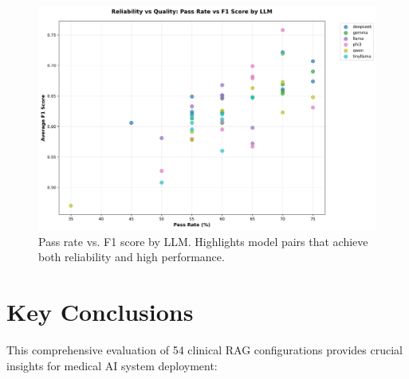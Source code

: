 \begin{figure}[!htbp]
  \centering
  \includegraphics[width=\textwidth]{chap4_results/images/pass_rate_vs_score.png}
  \caption{Pass rate vs. F1 score by LLM. Highlights model pairs that achieve both reliability and high performance.}
  \label{fig:pass_rate_vs_score}
\end{figure}

\section{Key Conclusions}

This comprehensive evaluation of 54 clinical RAG configurations provides crucial insights for medical AI system deployment:

